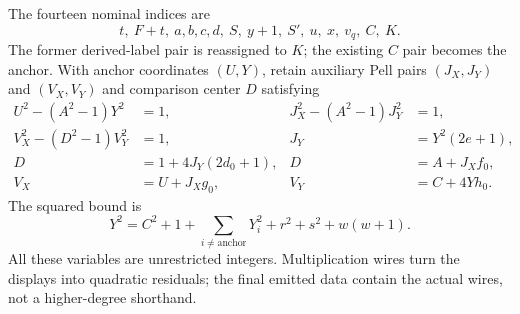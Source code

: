 \documentclass[11pt]{article}
\theoremstyle{definition}\newtheorem{remark}[theorem]{Remark}
\begin{document}
The fourteen nominal indices are
\begin{equation}\label{eq:indices}
 t,\ F+t,\ a,b,c,d,\ S,\ y+1,\ S',\ u,\ x,\ v_q,\ C,\ K.
\end{equation}
The former derived-label pair is reassigned to $K$; the existing $C$
pair becomes the anchor. With anchor coordinates $(U,Y)$, retain auxiliary
Pell pairs $(J_X,J_Y)$ and $(V_X,V_Y)$ and comparison center $D$ satisfying
\begin{align*}
 U^2-(A^2-1)Y^2&=1,&J_X^2-(A^2-1)J_Y^2&=1,\\
 V_X^2-(D^2-1)V_Y^2&=1,&J_Y&=Y^2(2e+1),\\
 D&=1+4J_Y(2d_0+1),&D&=A+J_Xf_0,\\
 V_X&=U+J_Xg_0,&V_Y&=C+4Yh_0.
\end{align*}
The squared bound is
\begin{equation}\label{eq:cap}
 Y^2=C^2+1+\sum_{i\ne\mathrm{anchor}}Y_i^2
             +r^2+s^2+w(w+1).
\end{equation}
All these variables are unrestricted integers. Multiplication wires turn
the displays into quadratic residuals; the final emitted data contain the
actual wires, not a higher-degree shorthand.
\end{document}
